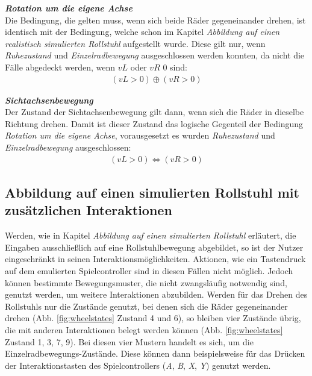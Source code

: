 \textbf{\textit{Rotation um die eigene Achse}}\\
Die Bedingung, die gelten muss, wenn sich beide Räder gegeneinander drehen, ist identisch mit der Bedingung, welche schon im Kapitel \textit{Abbildung auf einen realistisch simulierten Rollstuhl} aufgestellt wurde.
Diese gilt nur, wenn \textit{Ruhezustand} und \textit{Einzelradbewegung} ausgeschlossen werden konnten, da nicht die Fälle abgedeckt werden, wenn $vL$ oder $vR$ 0 sind:
\begin{align}
    (vL > 0) \oplus (vR > 0)
\end{align}

\textbf{\textit{Sichtachsenbewegung}}\\
Der Zustand der Sichtachsenbewegung gilt dann, wenn sich die Räder in dieselbe Richtung drehen.
Damit ist dieser Zustand das logische Gegenteil der Bedingung \textit{Rotation um die eigene Achse}, vorausgesetzt es wurden \textit{Ruhezustand} und \textit{Einzelradbewegung} ausgeschlossen:
\begin{align}
    (vL > 0) \Leftrightarrow (vR > 0)
\end{align}

\subsection{Abbildung auf einen simulierten Rollstuhl mit zusätzlichen Interaktionen}
Werden, wie in Kapitel \textit{Abbildung auf einen simulierten Rollstuhl} erläutert, die Eingaben ausschließlich auf eine Rollstuhlbewegung abgebildet, so ist der Nutzer eingeschränkt in seinen Interaktionsmöglichkeiten.
Aktionen, wie ein Tastendruck auf dem emulierten Spielcontroller sind in diesen Fällen nicht möglich.
Jedoch können bestimmte Bewegungsmuster, die nicht zwangsläufig notwendig sind, genutzt werden, um weitere Interaktionen abzubilden.
Werden für das Drehen des Rollstuhls nur die Zustände genutzt, bei denen sich die Räder gegeneinander drehen (Abb. \ref{fig:wheelstates} Zustand 4 und 6), so bleiben vier Zustände übrig, die mit anderen Interaktionen belegt werden können (Abb. \ref{fig:wheelstates} Zustand 1, 3, 7, 9).
Bei diesen vier Mustern handelt es sich, um die Einzelradbewegungs-Zustände.
Diese können dann beispielsweise für das Drücken der Interaktionstasten des Spielcontrollers (\textit{A}, \textit{B}, \textit{X}, \textit{Y}) genutzt werden.

